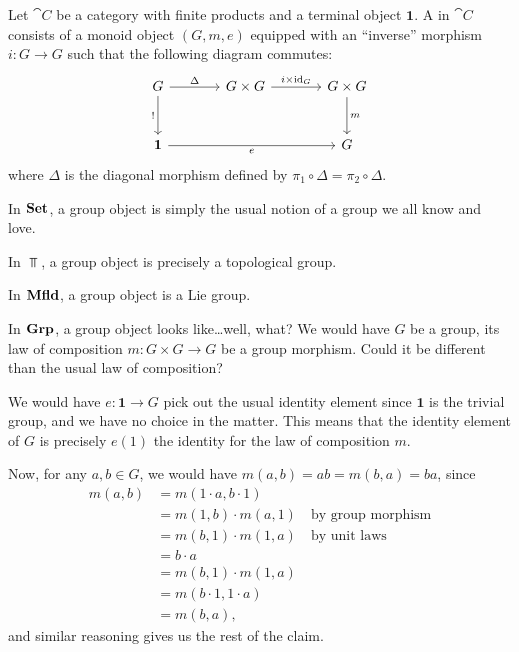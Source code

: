 \begin{node}
\begin{definition}\label{internal-0009}%
Let $\cat{C}$ be a category with finite products and a terminal object
$\mathbf{1}$. A  in $\cat{C}$ consists of a monoid
object $(G,m,e)$ equipped with an ``inverse'' morphism $i\colon G\to G$
such that the following diagram commutes:
\begin{equation*}
\begin{tikzcd}[sep=large]
G\ar[d,swap,"!"]\ar[r,"\Delta"] & G\times G\ar[r,"i\times\id_{G}"] & G\times G\ar[d,"m"]\\
\mathbf{1}\ar[rr,swap,"e"] & & G
\end{tikzcd}
\end{equation*}
where $\Delta$ is the diagonal morphism defined by
$\pi_{1}\circ\Delta=\pi_{2}\circ\Delta$.
\end{definition}

\begin{node}[Examples]\label{internal-000A}%

\begin{node}\label{internal-000B}%
In $\mathbf{Set}$, a group object is simply the usual notion of a group we all
know and love.
\end{node}

\begin{node}\label{internal-000C}%
In $\Top$, a group object is precisely a topological group.
\end{node}

\begin{node}\label{internal-000D}%
In $\mathbf{Mfld}$, a group object is a Lie group.
\end{node}

\begin{node}\label{internal-000E}%
In $\mathbf{Grp}$, a group object looks like\dots well, what? We would have $G$
be a group, its law of composition $m\colon G\times G\to G$ be a group
morphism. Could it be different than the usual law of composition? 

We would have $e\colon\mathbf{1}\to G$ pick out the usual identity
element since $\mathbf{1}$ is the trivial group, and we have no choice
in the matter. This means that the identity element of $G$ is precisely
$e(1)$ the identity for the law of composition $m$.

Now, for any $a,b\in G$, we would have $m(a,b)=ab=m(b,a)=ba$, since
\begin{subequations}
\begin{align}
m(a,b) &= m(1\cdot a,b\cdot 1)\\
&=m(1,b)\cdot m(a,1)\quad\mbox{by group morphism}\\
&=m(b,1)\cdot m(1,a)\quad\mbox{by unit laws}\\
&=b\cdot a\\
&=m(b,1)\cdot m(1,a)\\
&=m(b\cdot 1,1\cdot a)\\
&=m(b,a),
\end{align}
\end{subequations}
and similar reasoning gives us the rest of the claim.


\end{node}
\end{node}
\end{node}
